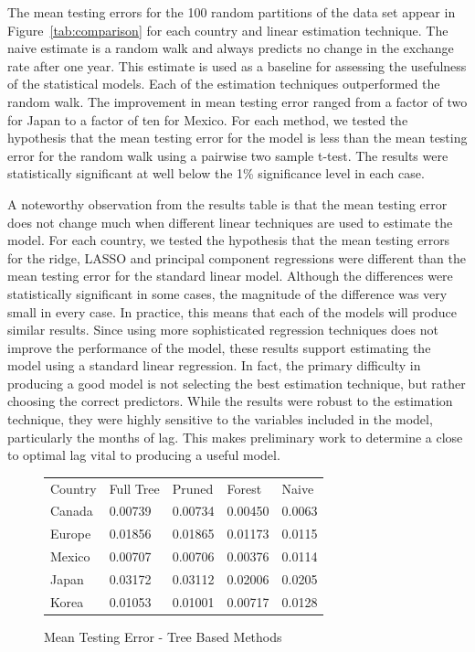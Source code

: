 \documentclass{sig-alternate-05-2015}
\begin{document}
The mean testing errors for the 100 random partitions of the data set appear in Figure~\ref{tab:comparison} for each country and linear estimation technique. The naive estimate is a random walk and always predicts no change in the exchange rate after one year. This estimate is used as a baseline for assessing the usefulness of the statistical models. Each of the estimation techniques outperformed the random walk. The improvement in mean testing error ranged from a factor of two for Japan to a factor of ten for Mexico. For each method, we tested the hypothesis that the mean testing error for the model is less than the mean testing error for the random walk using a pairwise two sample t-test. The results were statistically significant at well below the 1\% significance level in each case.
\par{} A noteworthy observation from the results table is that the mean testing error does not change much when different linear techniques are used to estimate the model. For each country, we tested the hypothesis that the mean testing errors for the ridge, LASSO and principal component regressions were different than the mean testing error for the standard linear model. Although the differences were statistically significant in some cases, the magnitude of the difference was very small in every case. In practice, this means that each of the models will produce similar results. Since using more sophisticated regression techniques does not improve the performance of the model, these results support estimating the model using a standard linear regression. In fact, the primary difficulty in producing a good model is not selecting the best estimation technique, but rather choosing the correct predictors. While the results were robust to the estimation technique, they were highly sensitive to the variables included in the model, particularly the months of lag. This makes preliminary work to determine a close to optimal lag vital to producing a useful model.

\begin{figure}
\centering
\caption{Mean Testing Error - Tree Based Methods}
\begin{tabular}{l l l l l}
Country	& Full Tree & Pruned    & Forest    & Naive \\
Canada 	& 0.00739 	& 0.00734 	& 0.00450 	& 0.0063 \\
Europe	& 0.01856 	& 0.01865 	& 0.01173	& 0.0115 \\
Mexico	& 0.00707 	& 0.00706 	& 0.00376   & 0.0114 \\
Japan	& 0.03172 	& 0.03112 	& 0.02006   & 0.0205 \\
Korea	& 0.01053 	& 0.01001 	& 0.00717	& 0.0128 \\
\end{tabular}
\label{tab:treecomparison}
\end{figure} 
\end{document}
